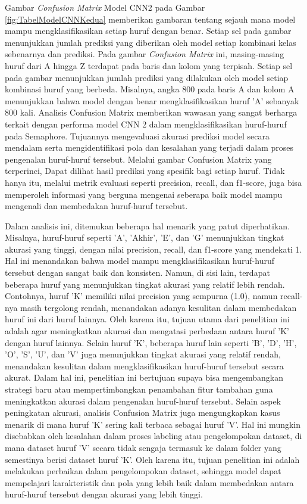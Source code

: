 Gambar \textit{Confusion Matrix} Model CNN2 pada Gambar \ref{fig:TabelModelCNNKedua} memberikan gambaran tentang sejauh mana model mampu mengklasifikasikan setiap huruf dengan benar. Setiap sel pada gambar menunjukkan jumlah prediksi yang diberikan oleh model setiap kombinasi kelas sebenarnya dan prediksi. Pada gambar \textit{Confusion Matrix} ini, masing-masing huruf dari A hingga Z terdapat pada baris dan kolom yang terpisah. Setiap sel pada gambar menunjukkan jumlah prediksi yang dilakukan oleh model setiap kombinasi huruf yang berbeda. Misalnya, angka 800 pada baris A dan kolom A menunjukkan bahwa model dengan benar mengklasifikasikan huruf 'A' sebanyak 800 kali. Analisis Confusion Matrix memberikan wawasan yang sangat berharga terkait dengan performa model CNN 2 dalam mengklasifikasikan huruf-huruf pada Semaphore. Tujuannya mengevaluasi akurasi prediksi model secara mendalam serta mengidentifikasi pola dan kesalahan yang terjadi dalam proses pengenalan huruf-huruf tersebut. Melalui gambar Confusion Matrix yang terperinci, Dapat dilihat hasil prediksi yang spesifik bagi setiap huruf. Tidak hanya itu, melalui metrik evaluasi seperti precision, recall, dan f1-score, juga bisa memperoleh informasi yang berguna mengenai seberapa baik model mampu mengenali dan membedakan huruf-huruf tersebut.

Dalam analisis ini, ditemukan beberapa hal menarik yang patut diperhatikan. Misalnya, huruf-huruf seperti 'A', 'Akhir', 'E', dan 'G' menunjukkan tingkat akurasi yang tinggi, dengan nilai precision, recall, dan f1-score yang mendekati 1. Hal ini menandakan bahwa model mampu mengklasifikasikan huruf-huruf tersebut dengan sangat baik dan konsisten. Namun, di sisi lain, terdapat beberapa huruf yang menunjukkan tingkat akurasi yang relatif lebih rendah. Contohnya, huruf 'K' memiliki nilai precision yang sempurna (1.0), namun recall-nya masih tergolong rendah, menandakan adanya kesulitan dalam membedakan huruf ini dari huruf lainnya. Oleh karena itu, tujuan utama dari penelitian ini adalah agar meningkatkan akurasi dan mengatasi perbedaan antara huruf 'K' dengan huruf lainnya. Selain huruf 'K', beberapa huruf lain seperti 'B', 'D', 'H', 'O', 'S', 'U', dan 'V' juga menunjukkan tingkat akurasi yang relatif rendah, menandakan kesulitan dalam mengklasifikasikan huruf-huruf tersebut secara akurat. Dalam hal ini, penelitian ini bertujuan supaya bisa mengembangkan strategi baru atau mempertimbangkan penambahan fitur tambahan guna meningkatkan akurasi dalam pengenalan huruf-huruf tersebut. Selain aspek peningkatan akurasi, analisis Confusion Matrix juga mengungkapkan kasus menarik di mana huruf 'K' sering kali terbaca sebagai huruf 'V'. Hal ini mungkin disebabkan oleh kesalahan dalam proses labeling atau pengelompokan dataset, di mana dataset huruf 'V' secara tidak sengaja termasuk ke dalam folder yang semestinya berisi dataset huruf 'K'. Oleh karena itu, tujuan penelitian ini adalah melakukan perbaikan dalam pengelompokan dataset, sehingga model dapat mempelajari karakteristik dan pola yang lebih baik dalam membedakan antara huruf-huruf tersebut dengan akurasi yang lebih tinggi.

